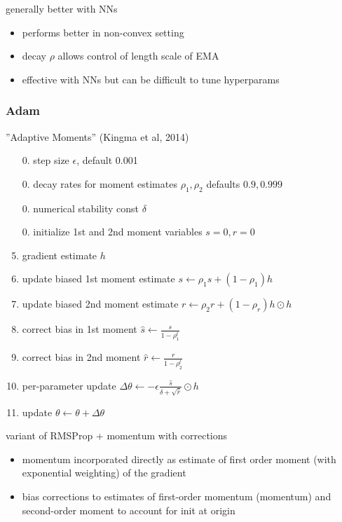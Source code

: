 \documentclass[]{article}
\begin{document}
\vspace{1em}

generally better with NNs
\begin{itemize}
    \item performs better in non-convex setting
    \item decay $\rho$ allows control of length scale of EMA
    \item effective with NNs but can be difficult to tune hyperparams
\end{itemize}

\subsubsection{Adam}%
\label{ssub:adam}

''Adaptive Moments'' (Kingma et al, 2014)
\begin{enumerate}
    \item[0.] step size $\epsilon$, default 0.001
    \item[0.] decay rates for moment estimates $\rho_1, \rho_2$ defaults $0.9, 0.999$
    \item[0.] numerical stability const $\delta$
    \item[0.] initialize 1st and 2nd moment variables $s = 0, r = 0$
    \item gradient estimate $h$
    \item update biased 1st moment estimate $s \gets \rho_1 s + (1 - \rho_1) h$
    \item update biased 2nd moment estimate $r \gets \rho_2 r + (1 - \rho_r) h \odot h$
    \item correct bias in 1st moment $\hat s \gets \frac{s}{1 - \rho_1^t}$
    \item correct bias in 2nd moment $\hat r \gets \frac{r}{1 - \rho_2^t}$
    \item per-parameter update $\Delta \theta \gets - \epsilon \frac{\hat s}{\delta + \sqrt{\hat r}} \odot h$
    \item update $\theta \gets \theta + \Delta \theta$
\end{enumerate}


variant of RMSProp + momentum with corrections
\begin{itemize}
    \item momentum incorporated directly as estimate of first order moment (with exponential weighting) of the gradient
    \item bias corrections to estimates of first-order momentum (momentum) and second-order moment to account for init at origin
\end{itemize}
\end{document}
